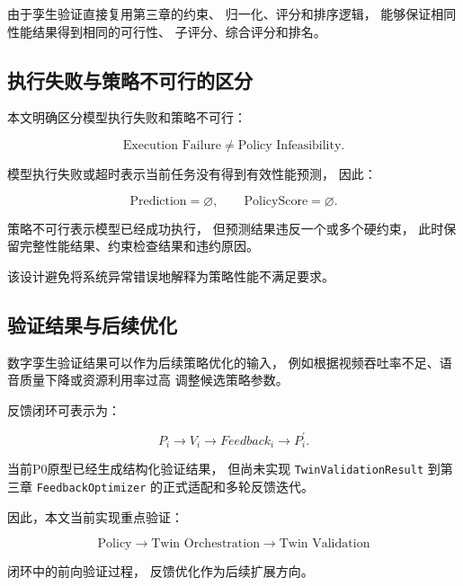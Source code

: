 \documentclass[lang=cn,12pt]{elegantbook}
\begin{document}
由于孪生验证直接复用第三章的约束、
归一化、评分和排序逻辑，
能够保证相同性能结果得到相同的可行性、
子评分、综合评分和排名。


\subsection*{执行失败与策略不可行的区分}

本文明确区分模型执行失败和策略不可行：

\begin{equation}
\text{Execution Failure}
\neq
\text{Policy Infeasibility}.
\label{eq:execution_failure_not_infeasible}
\end{equation}

模型执行失败或超时表示当前任务没有得到有效性能预测，
因此：

\begin{equation}
\text{Prediction}
=
\varnothing,
\qquad
\text{PolicyScore}
=
\varnothing.
\end{equation}

策略不可行表示模型已经成功执行，
但预测结果违反一个或多个硬约束，
此时保留完整性能结果、约束检查结果和违约原因。

该设计避免将系统异常错误地解释为策略性能不满足要求。


\subsection*{验证结果与后续优化}

数字孪生验证结果可以作为后续策略优化的输入，
例如根据视频吞吐率不足、语音质量下降或资源利用率过高
调整候选策略参数。

反馈闭环可表示为：

\begin{equation}
P_i
\rightarrow
V_i
\rightarrow
Feedback_i
\rightarrow
P_i^{\prime}.
\label{eq:twin_feedback_loop}
\end{equation}

当前P0原型已经生成结构化验证结果，
但尚未实现
\texttt{TwinValidationResult}
到第三章
\texttt{FeedbackOptimizer}
的正式适配和多轮反馈迭代。

因此，本文当前实现重点验证：

\begin{equation}
\text{Policy}
\rightarrow
\text{Twin Orchestration}
\rightarrow
\text{Twin Validation}
\end{equation}

闭环中的前向验证过程，
反馈优化作为后续扩展方向。
\end{document}
